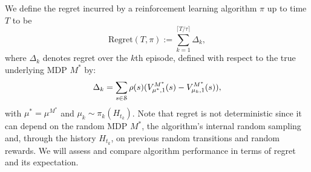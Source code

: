 We define the regret incurred by a reinforcement learning algorithm $\pi$ up to time $T$ to be
$$\text{Regret}(T, \pi) := \sum_{k=1}^{\lceil T/\tau \rceil} \Delta_k,$$
where $\Delta_k$ denotes regret over the $k$th episode, defined with respect to the true underlying MDP $M^*$ by:
$$\Delta_k = \sum_{s \in \mathcal{S}} \rho(s) (V^{M^*}_{\mu^*, 1}(s) - V^{M^{*}}_{\mu_k, 1}(s)),$$
with $\mu^* = \mu^{M^*}$ and $\mu_{k}\sim \pi_{k}(H_{t_k})$. Note that regret is not deterministic since it can depend on the random MDP $M^*$, the algorithm's internal random sampling and, through the history $H_{t_k}$, on previous random transitions and random rewards. We will assess and compare algorithm performance in terms of regret and its expectation.
